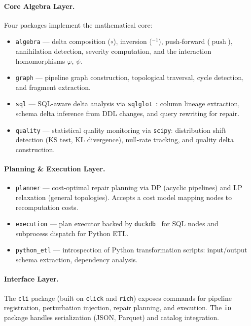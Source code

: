 \documentclass[sigplan,screen,nonacm]{acmart}
\newcommand{\compose}{\mathbin{\circ}}
\newcommand{\push}{\operatorname{push}}
\begin{document}
\paragraph{Core Algebra Layer.}
Four packages implement the mathematical core:
\begin{itemize}
\item \texttt{algebra} --- delta composition ($\compose$), inversion
  (${}^{-1}$), push-forward ($\push$), annihilation detection, severity
  computation, and the interaction homomorphisms $\varphi$, $\psi$.
\item \texttt{graph} --- pipeline graph construction, topological
  traversal, cycle detection, and fragment extraction.
\item \texttt{sql} --- SQL-aware delta analysis via
  \texttt{sqlglot}~\cite{sqlglot2023}: column lineage extraction,
  schema delta inference from DDL changes, and query rewriting for repair.
\item \texttt{quality} --- statistical quality monitoring via
  \texttt{scipy}: distribution shift detection (KS test, KL divergence),
  null-rate tracking, and quality delta construction.
\end{itemize}

\paragraph{Planning \& Execution Layer.}
\begin{itemize}
\item \texttt{planner} --- cost-optimal repair planning via DP (acyclic
  pipelines) and LP relaxation (general topologies).  Accepts a cost model
  mapping nodes to recomputation costs.
\item \texttt{execution} --- plan executor backed by
  \texttt{duckdb}~\cite{raasveldt2019duckdb} for SQL nodes and subprocess
  dispatch for Python ETL.
\item \texttt{python\_etl} --- introspection of Python transformation
  scripts: input/output schema extraction, dependency analysis.
\end{itemize}

\paragraph{Interface Layer.}
The \texttt{cli} package (built on \texttt{click} and \texttt{rich})
exposes commands for pipeline registration, perturbation injection, repair
planning, and execution.  The \texttt{io} package handles serialization
(JSON, Parquet) and catalog integration.
\end{document}
